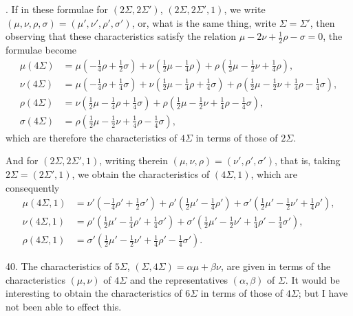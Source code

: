 \documentclass[12pt,a4paper]{article}
\begin{document}
. If in these formulae for $(2\Sigma, 2\Sigma')$, $(2\Sigma, 2\Sigma', 1)$, we write $(\mu, \nu, \rho, \sigma) = (\mu', \nu', \rho', \sigma')$, or, what is the same thing, write $\Sigma = \Sigma'$, then observing that these characteristics satisfy the relation $\mu - 2\nu + \frac{1}{2}\rho - \sigma = 0$, the formulae become
\begin{align*}
\mu(4\Sigma) &= \mu(-\tfrac{1}{4}\rho + \tfrac{1}{2}\sigma) + \nu(\tfrac{1}{2}\mu - \tfrac{1}{4}\rho) + \rho(\tfrac{1}{2}\mu - \tfrac{1}{2}\nu + \tfrac{1}{4}\rho),\\
\nu(4\Sigma) &= \mu(-\tfrac{1}{4}\rho + \tfrac{1}{4}\sigma) + \nu(\tfrac{1}{2}\mu - \tfrac{1}{4}\rho + \tfrac{1}{4}\sigma) + \rho(\tfrac{1}{2}\mu - \tfrac{1}{2}\nu + \tfrac{1}{4}\rho - \tfrac{1}{4}\sigma),\\
\rho(4\Sigma) &= \nu(\tfrac{1}{2}\mu - \tfrac{1}{4}\rho + \tfrac{1}{4}\sigma) + \rho(\tfrac{1}{2}\mu - \tfrac{1}{2}\nu + \tfrac{1}{4}\rho - \tfrac{1}{4}\sigma),\\
\sigma(4\Sigma) &= \rho(\tfrac{1}{2}\mu - \tfrac{1}{2}\nu + \tfrac{1}{4}\rho - \tfrac{1}{4}\sigma),
\end{align*}
which are therefore the characteristics of $4\Sigma$ in terms of those of $2\Sigma$.

And for $(2\Sigma, 2\Sigma', 1)$, writing therein $(\mu, \nu, \rho) = (\nu', \rho', \sigma')$, that is, taking $2\Sigma = (2\Sigma', 1)$, we obtain the characteristics of $(4\Sigma, 1)$, which are consequently
\begin{align*}
\mu(4\Sigma, 1) &= \nu'(-\tfrac{1}{4}\rho' + \tfrac{1}{2}\sigma') + \rho'(\tfrac{1}{2}\mu' - \tfrac{1}{4}\rho') + \sigma'(\tfrac{1}{2}\mu' - \tfrac{1}{2}\nu' + \tfrac{1}{4}\rho'),\\
\nu(4\Sigma, 1) &= \rho'(\tfrac{1}{2}\mu' - \tfrac{1}{4}\rho' + \tfrac{1}{4}\sigma') + \sigma'(\tfrac{1}{2}\mu' - \tfrac{1}{2}\nu' + \tfrac{1}{4}\rho' - \tfrac{1}{4}\sigma'),\\
\rho(4\Sigma, 1) &= \sigma'(\tfrac{1}{2}\mu' - \tfrac{1}{2}\nu' + \tfrac{1}{4}\rho' - \tfrac{1}{4}\sigma').
\end{align*}

40. The characteristics of $5\Sigma$, $(\Sigma, 4\Sigma) = \alpha\mu + \beta\nu$, are given in terms of the characteristics $(\mu, \nu)$ of $4\Sigma$ and the representatives $(\alpha, \beta)$ of $\Sigma$. It would be interesting to obtain the characteristics of $6\Sigma$ in terms of those of $4\Sigma$; but I have not been able to effect this.
\end{document}
